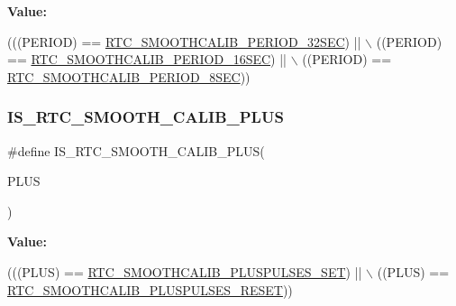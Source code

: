 {\bfseries Value\+:}
\begin{DoxyCode}
(((PERIOD) == \hyperlink{group___r_t_c_ex___smooth__calib__period___definitions_gaab8a844313898595cd72f86570198e5a}{RTC\_SMOOTHCALIB\_PERIOD\_32SEC}) || \(\backslash\)
                                            ((PERIOD) == 
      \hyperlink{group___r_t_c_ex___smooth__calib__period___definitions_ga0c192bdebd2496f60b8a4aa7db499262}{RTC\_SMOOTHCALIB\_PERIOD\_16SEC}) || \(\backslash\)
                                            ((PERIOD) == 
      \hyperlink{group___r_t_c_ex___smooth__calib__period___definitions_ga0993db27ee5b25c8db41c8e58b478ffe}{RTC\_SMOOTHCALIB\_PERIOD\_8SEC}))
\end{DoxyCode}
\mbox{\label{group___r_t_c_ex___i_s___r_t_c___definitions_gad0081b479cf6d71ac588a483d09d7b75}} 
\subsubsection{\texorpdfstring{I\+S\+\_\+\+R\+T\+C\+\_\+\+S\+M\+O\+O\+T\+H\+\_\+\+C\+A\+L\+I\+B\+\_\+\+P\+L\+US}{IS\_RTC\_SMOOTH\_CALIB\_PLUS}}
{\footnotesize\ttfamily \#define I\+S\+\_\+\+R\+T\+C\+\_\+\+S\+M\+O\+O\+T\+H\+\_\+\+C\+A\+L\+I\+B\+\_\+\+P\+L\+US(\begin{DoxyParamCaption}\item[{}]{P\+L\+US }\end{DoxyParamCaption})}

{\bfseries Value\+:}
\begin{DoxyCode}
(((PLUS) == \hyperlink{group___r_t_c_ex___smooth__calib___plus__pulses___definitions_ga53eabbf840a8631b955636bbfaf9bc83}{RTC\_SMOOTHCALIB\_PLUSPULSES\_SET}) || \(\backslash\)
                                        ((PLUS) == 
      \hyperlink{group___r_t_c_ex___smooth__calib___plus__pulses___definitions_gaed8a5d1a5400612bde6fe30b32f350e7}{RTC\_SMOOTHCALIB\_PLUSPULSES\_RESET}))
\end{DoxyCode}
\mbox{\label{group___r_t_c_ex___i_s___r_t_c___definitions_gaa695f102d84ff00aef2b7539f1293b00}} 
